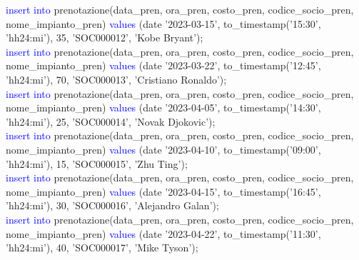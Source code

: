 \documentclass{article}
\begin{document}
\begin{flushleft}
{        \hspace*{0.5em}\textcolor{blue}{insert into} prenotazione(data\_pren, ora\_pren, costo\_pren, codice\_socio\_pren, \hspace*{0.5em}nome\_impianto\_pren) \textcolor{blue}{values} (date '2023-03-15', to\_timestamp('15:30', 'hh24:mi'), \hspace*{0.5em}35, 'SOC000012', 'Kobe Bryant'); \\
        \vspace{2mm}
        \hspace*{0.5em}\textcolor{blue}{insert into} prenotazione(data\_pren, ora\_pren, costo\_pren, codice\_socio\_pren, \hspace*{0.5em}nome\_impianto\_pren) \textcolor{blue}{values} (date '2023-03-22', to\_timestamp('12:45', 'hh24:mi'), \hspace*{0.5em}70, 'SOC000013', 'Cristiano Ronaldo'); \\
        \vspace{2mm}
        \hspace*{0.5em}\textcolor{blue}{insert into} prenotazione(data\_pren, ora\_pren, costo\_pren, codice\_socio\_pren, \hspace*{0.5em}nome\_impianto\_pren) \textcolor{blue}{values} (date '2023-04-05', to\_timestamp('14:30', 'hh24:mi'), \hspace*{0.5em}25, 'SOC000014', 'Novak Djokovic'); \\
        \vspace{2mm}
        \hspace*{0.5em}\textcolor{blue}{insert into} prenotazione(data\_pren, ora\_pren, costo\_pren, codice\_socio\_pren, \hspace*{0.5em}nome\_impianto\_pren) \textcolor{blue}{values} (date '2023-04-10', to\_timestamp('09:00', 'hh24:mi'), \hspace*{0.5em}15, 'SOC000015', 'Zhu Ting'); \\
        \vspace{2mm}
        \hspace*{0.5em}\textcolor{blue}{insert into} prenotazione(data\_pren, ora\_pren, costo\_pren, codice\_socio\_pren, \hspace*{0.5em}nome\_impianto\_pren) \textcolor{blue}{values} (date '2023-04-15', to\_timestamp('16:45', 'hh24:mi'), \hspace*{0.5em}30, 'SOC000016', 'Alejandro Galan'); \\
        \vspace{2mm}
        \hspace*{0.5em}\textcolor{blue}{insert into} prenotazione(data\_pren, ora\_pren, costo\_pren, codice\_socio\_pren, \hspace*{0.5em}nome\_impianto\_pren) \textcolor{blue}{values} (date '2023-04-22', to\_timestamp('11:30', 'hh24:mi'), \hspace*{0.5em}40, 'SOC000017', 'Mike Tyson'); \\
}
\end{flushleft}
\end{document}
